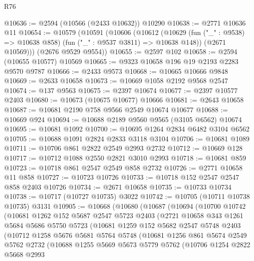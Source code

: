 \begin{lexlean}{R76}
\begin{coremodule}
@10636 := @2594 (@10566 (@2433 @10632)) @10290
@10638 := @2771 @10636 @11
@10654 := @10579
    (@10591
      (@10606
        (@10612
          (@10629 (fun ("_" : @9538) => @10638 @858) (fun ("_" : @9537 @3811) => @10638 @148))
          (@2671 @10569)))
      (@2676 @9529 @9554))
@10655 := @2597 @102
@10658 := @2594 (@10655 @10577) @10569
@10665 := @9323 @10658 @196 @19 @2193 @2283 @9570 @9787
@10666 := @2433 @9573
@10668 := @10665 @10666 @9848
@10669 := @2633 @10658
@10673 := @10669 @1058 @2192 @9568 @2547
@10674 := @137 @9563
@10675 := @2397 @10674
@10677 := @2397 @10577 @2403
@10680 := @10673 (@10675 @10677) @10666
@10681 := @2643 @10658
@10687 := @10681 @2190 @758 @9566 @2549 @10674 @10677
@10688 := @10669 @924
@10694 := @10688 @2189 @9560 @9565 (@3105 @6562) @10674
@10695 := @10681 @1092
@10700 := @10695 @1264 @2834 @6482 @3104 @6562
@10705 := @10688 @1091 @2824 @2833 @3118 @3104
@10706 := @10681 @1089
@10711 := @10706 @861 @2822 @2549 @2993 @2732
@10712 := @10669 @128
@10717 := @10712 @1088 @2550 @2821 @3010 @2993
@10718 := @10681 @859
@10723 := @10718 @861 @2547 @2549 @858 @2732
@10726 := @2771 @10658 @11 @858
@10727 := @10723 @10726
@10733 := @10718 @152 @2547 @2547 @858 @2403 @10726
@10734 := @2671 @10658
@10735 := @10733 @10734
@10738 := @10717 (@10727 @10735) @3022
@10742 := @10705 (@10711 @10738 @10735) @3131
@10905 := @10668
    (@10680
      (@10687
        (@10694
          (@10700
            @10742
            (@10681
              @1262
              @152
              @5687
              @2547
              @5723
              @2403
              (@2721
                @10658
                @343
                @1261
                @5684
                @5686
                @5750
                @5723
                (@10681
                  @1259
                  @152
                  @5682
                  @2547
                  @5748
                  @2403
                  (@10712
                    @1258
                    @5676
                    @5681
                    @5764
                    @5748
                    (@10681
                      @1256
                      @861
                      @5674
                      @2549
                      @5762
                      @2732
                      (@10688
                        @1255
                        @5669
                        @5673
                        @5779
                        @5762
                        (@10706
                          @1254
                          @2822
                          @5668
                          @2993

\end{coremodule}
\end{lexlean}
